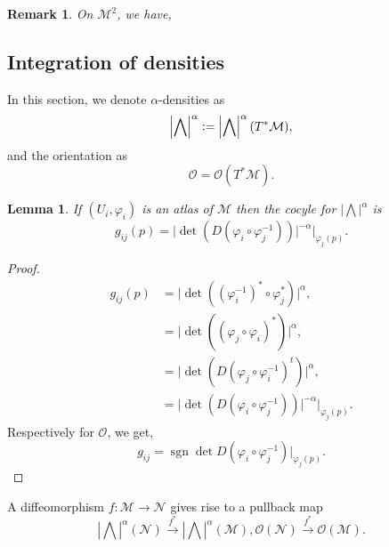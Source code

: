 \documentclass[8pt]{article}
\newtheorem{lemma}{Lemma}[section]
\newtheorem{remark}{Remark}[section]
\DeclareMathOperator{\grad}{grad}
\DeclareMathOperator{\divergence}{div}
\DeclareMathOperator{\sgn}{sgn}
\newcommand{\defeq}{\vcentcolon=}
\newcommand{\M}[0]{\mathcal{M}}
\newcommand{\maniN}[0]{\mathcal{N}}
\newcommand{\cinf}[0]{\mathcal{C}^\infty}
\begin{document}
\begin{remark}
  On $\M^2$, we have,
  \begin{center}
  \end{center}
\end{remark}
\subsection{Integration of densities}
In this section, we denote $\alpha$-densities as 
\begin{equation*}
  \left\vert\bigwedge\right\vert^\alpha\defeq \left\vert\bigwedge\right\vert^\alpha(T^*\M),
\end{equation*}
and the orientation as
\begin{equation*}
\mathcal{O} = \mathcal{O}(T^*\M).  
\end{equation*}
\begin{lemma}
  If $(U_i,\varphi_i)$ is an atlas of $\M$ then the cocyle for $\left\vert\bigwedge\right\vert^\alpha$ is 
  \begin{equation*}
    g_{ij}(p) = \vert \det(D(\varphi_i\circ\varphi_j^{-1}))\vert^{-\alpha}|_{\varphi_j(p)}.
  \end{equation*}
\end{lemma}
\begin{proof}
  \begin{align*}
    g_{ij}(p) & = \vert \det((\varphi_i^{-1})^*\circ\varphi_j^*)\vert^\alpha,\\
    &= \vert\det ((\varphi_j\circ\varphi_i)^*)\vert^\alpha,\\
    & = \vert\det(D(\varphi_j\circ\varphi_i^{-1})^t)\vert^\alpha,\\
    & = \vert \det(D(\varphi_i\circ\varphi_j^{-1}))\vert^{-\alpha}|_{\varphi_j(p)}.
  \end{align*}
  Respectively for $\mathcal{O}$, we get,
  \begin{equation*}
    g_{ij} = \sgn \det D(\varphi_i\circ\varphi_j^{-1})|_{\varphi_j(p)}.
  \end{equation*}
\end{proof}
A diffeomorphism $f:\M\to\maniN$ gives rise to a pullback map 
  \begin{equation*}
    \left\vert\bigwedge\right\vert^\alpha(\maniN)\stackrel{f^*}{\to}\left\vert\bigwedge\right\vert^\alpha(\M), \mathcal{O}(\maniN)\stackrel{f^*}{\to}\mathcal{O}(\M).
  \end{equation*}
\end{document}
